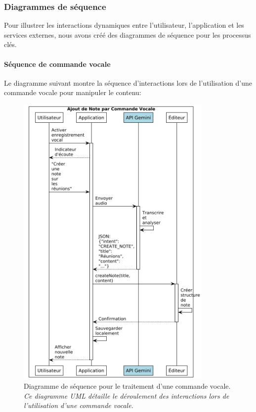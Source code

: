     \subsubsection{Diagrammes de séquence}
    
    Pour illustrer les interactions dynamiques entre l'utilisateur, l'application et les services externes, nous avons créé des diagrammes de séquence pour les processus clés.
    
    \paragraph{Séquence de commande vocale}
    
    Le diagramme suivant montre la séquence d'interactions lors de l'utilisation d'une commande vocale pour manipuler le contenu:
    
        \begin{figure}[htbp]
        \centering
        \includegraphics[width=0.85\textwidth]{assets/docs/SayNote_sequence_voice.png}
        \caption{Diagramme de séquence pour le traitement d'une commande vocale. \newline\textit{Ce diagramme UML détaille le déroulement des interactions lors de l'utilisation d'une commande vocale.}}
        \label{fig:sequence_voice_command}
    \end{figure}
    
